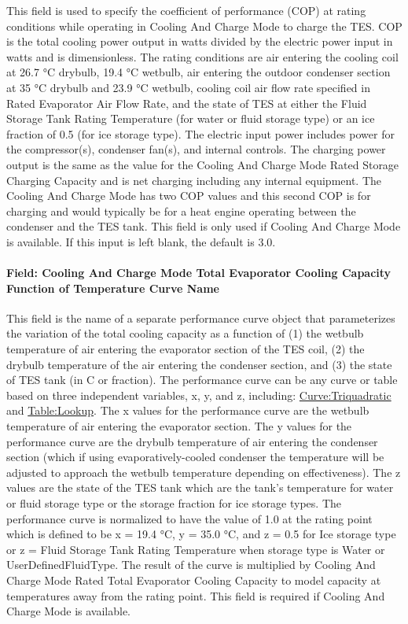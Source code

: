 This field is used to specify the coefficient of performance (COP) at rating conditions while operating in Cooling And Charge Mode to charge the TES. COP is the total cooling power output in watts divided by the electric power input in watts and is dimensionless. The rating conditions are air entering the cooling coil at 26.7 °C drybulb, 19.4 °C wetbulb, air entering the outdoor condenser section at 35 °C drybulb and 23.9 °C wetbulb, cooling coil air flow rate specified in Rated Evaporator Air Flow Rate, and the state of TES at either the Fluid Storage Tank Rating Temperature (for water or fluid storage type) or an ice fraction of 0.5 (for ice storage type). The electric input power includes power for the compressor(s), condenser fan(s), and internal controls. The charging power output is the same as the value for the Cooling And Charge Mode Rated Storage Charging Capacity and is net charging including any internal equipment. The Cooling And Charge Mode has two COP values and this second COP is for charging and would typically be for a heat engine operating between the condenser and the TES tank. This field is only used if Cooling And Charge Mode is available. If this input is left blank, the default is 3.0.

\paragraph{Field: Cooling And Charge Mode Total Evaporator Cooling Capacity Function of Temperature Curve Name}\label{field-cooling-and-charge-mode-total-evaporator-cooling-capacity-function-of-temperature-curve-name}

This field is the name of a separate performance curve object that parameterizes the variation of the total cooling capacity as a function of (1) the wetbulb temperature of air entering the evaporator section of the TES coil, (2) the drybulb temperature of the air entering the condenser section, and (3) the state of TES tank (in C or fraction). The performance curve can be any curve or table based on three independent variables, x, y, and z, including: \hyperref[curvetriquadratic]{Curve:Triquadratic} and \hyperref[tablelookup]{Table:Lookup}. The x values for the performance curve are the wetbulb temperature of air entering the evaporator section. The y values for the performance curve are the drybulb temperature of air entering the condenser section (which if using evaporatively-cooled condenser the temperature will be adjusted to approach the wetbulb temperature depending on effectiveness). The z values are the state of the TES tank which are the tank's temperature for water or fluid storage type or the storage fraction for ice storage types. The performance curve is normalized to have the value of 1.0 at the rating point which is defined to be x = 19.4 °C, y = 35.0 °C, and z = 0.5 for Ice storage type or z = Fluid Storage Tank Rating Temperature when storage type is Water or UserDefinedFluidType. The result of the curve is multiplied by Cooling And Charge Mode Rated Total Evaporator Cooling Capacity to model capacity at temperatures away from the rating point. This field is required if Cooling And Charge Mode is available.

